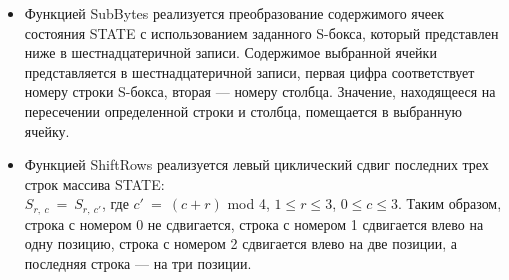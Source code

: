\documentclass{./civarticle}
\begin{document}
\begin{itemize}
    \item Функцией SubBytes реализуется преобразование содержимого ячеек состояния STATE с использованием заданного S-бокса, который представлен ниже в шестнадцатеричной записи. Содержимое выбранной ячейки представляется в шестнадцатеричной записи, первая цифра соответствует номеру строки S-бокса, вторая --- номеру столбца. Значение, находящееся на пересечении определенной строки и столбца, помещается в выбранную ячейку.

    \begin{figure}[h!]
    \end{figure}

    \begin{figure}[h]
    \end{figure}
    
    \item Функцией ShiftRows реализуется левый циклический сдвиг последних трех строк массива STATE: \\$S_{r,~c}~=~S_{r,~c'}$, где $c'~=~(c+r)$ mod 4, $1 \leq r \leq 3$, $0 \leq c \leq 3$. Таким образом, строка с номером 0 не сдвигается, строка с номером 1 сдвигается влево на одну позицию, строка с номером 2 сдвигается влево на две позиции, а последняя строка --- на три позиции.

    \begin{figure}[h!]
    \end{figure}
    

\end{itemize}
\end{document}
